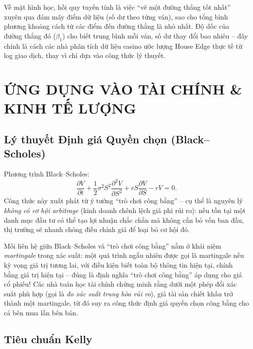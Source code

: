 \documentclass[12pt,a4paper]{article}
\theoremstyle{coloredthm}
\theoremstyle{coloreddef}
\theoremstyle{remark}
\begin{document}
\begin{giaithich}
Về mặt hình học, hồi quy tuyến tính là việc ``vẽ một đường thẳng tốt nhất'' xuyên qua đám mây điểm dữ liệu (số dư theo từng ván), sao cho tổng bình phương khoảng cách từ các điểm đến đường thẳng là nhỏ nhất. Độ dốc của đường thẳng đó ($\beta_1$) cho biết trung bình mỗi ván, số dư thay đổi bao nhiêu -- đây chính là cách các nhà phân tích dữ liệu casino ước lượng House Edge thực tế từ log giao dịch, thay vì chỉ dựa vào công thức lý thuyết.
\end{giaithich}

\section{ỨNG DỤNG VÀO TÀI CHÍNH \& KINH TẾ LƯỢNG}

\subsection{Lý thuyết Định giá Quyền chọn (Black--Scholes)}

Phương trình Black--Scholes:
\[
\frac{\partial V}{\partial t} + \frac{1}{2}\sigma^2 S^2 \frac{\partial^2 V}{\partial S^2} + rS\frac{\partial V}{\partial S} - rV = 0.
\]
Công thức này xuất phát từ ý tưởng ``trò chơi công bằng'' -- cụ thể là nguyên lý \emph{không có cơ hội arbitrage} (kinh doanh chênh lệch giá phi rủi ro): nếu tồn tại một danh mục đầu tư có thể tạo lợi nhuận chắc chắn mà không cần bỏ vốn ban đầu, thị trường sẽ nhanh chóng điều chỉnh giá để loại bỏ cơ hội đó.

\begin{giaithich}
Mối liên hệ giữa Black--Scholes và ``trò chơi công bằng'' nằm ở khái niệm \emph{martingale} trong xác suất: một quá trình ngẫu nhiên được gọi là martingale nếu kỳ vọng giá trị tương lai, với điều kiện biết toàn bộ thông tin hiện tại, chính bằng giá trị hiện tại -- đúng là định nghĩa ``trò chơi công bằng'' áp dụng cho giá cổ phiếu! Các nhà toán học tài chính chứng minh rằng dưới một phép đổi xác suất phù hợp (gọi là \emph{đo xác suất trung hòa rủi ro}), giá tài sản chiết khấu trở thành một martingale, từ đó suy ra công thức định giá quyền chọn công bằng cho cả bên mua lẫn bên bán.
\end{giaithich}

\subsection{Tiêu chuẩn Kelly}
\end{document}
